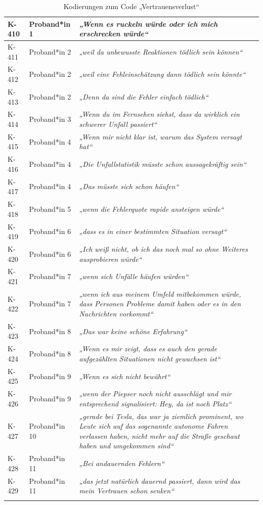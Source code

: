 {\begin{xltabular}{\textwidth}{
    |P{0.10\textwidth}
    |P{0.17\textwidth}
    |Y|
}
K-410 & Proband*in 1 & \textit{„Wenn es ruckeln würde oder ich mich erschrecken würde“} \\
\hline
K-411 & Proband*in 2 & \textit{„weil da unbewusste Reaktionen tödlich sein können“} \\
\hline
K-412 & Proband*in 2 & \textit{„weil eine Fehleinschätzung dann tödlich sein könnte“} \\
\hline
K-413 & Proband*in 2 & \textit{„Denn da sind die Fehler einfach tödlich“} \\
\hline
K-414 & Proband*in 3 & \textit{„Wenn du im Fernsehen siehst, dass da wirklich ein schwerer Unfall passiert“} \\
\hline
K-415 & Proband*in 4 & \textit{„Wenn mir nicht klar ist, warum das System versagt hat“} \\
\hline
K-416 & Proband*in 4 & \textit{„Die Unfallstatistik müsste schon aussagekräftig sein“} \\
\hline
K-417 & Proband*in 4 & \textit{„Das müsste sich schon häufen“} \\
\hline
K-418 & Proband*in 5 & \textit{„wenn die Fehlerquote rapide ansteigen würde“} \\
\hline
K-419 & Proband*in 6 & \textit{„dass es in einer bestimmten Situation versagt“} \\
\hline
K-420 & Proband*in 6 & \textit{„Ich weiß nicht, ob ich das noch mal so ohne Weiteres ausprobieren würde“} \\
\hline
K-421 & Proband*in 7 & \textit{„wenn sich Unfälle häufen würden“} \\
\hline
K-422 & Proband*in 7 & \textit{„wenn ich aus meinem Umfeld mitbekommen würde, dass Personen Probleme damit haben oder es in den Nachrichten vorkommt“} \\
\hline
K-423 & Proband*in 8 & \textit{„Das war keine schöne Erfahrung“} \\
\hline
K-424 & Proband*in 8 & \textit{„Wenn es mir zeigt, dass es auch den gerade aufgezählten Situationen nicht gewachsen ist“} \\
\hline
K-425 & Proband*in 9 & \textit{„Wenn es sich nicht bewährt“} \\
\hline
K-426 & Proband*in 9 & \textit{„wenn der Piepser noch nicht ausschlägt und mir entsprechend signalisiert: Hey, da ist noch Platz“} \\
\hline
K-427 & Proband*in 10 & \textit{„gerade bei Tesla, das war ja ziemlich prominent, wo Leute sich auf das sogenannte autonome Fahren verlassen haben, nicht mehr auf die Straße geschaut haben und umgekommen sind“} \\
\hline
K-428 & Proband*in 11 & \textit{„Bei andauernden Fehlern“} \\
\hline
K-429 & Proband*in 11 & \textit{„das jetzt natürlich dauernd passiert, dann wird das mein Vertrauen schon senken“} \\
\hline
\caption{Kodierungen zum Code „Vertrauensverlust“}\label{tab:kodiernachweis-vertrauensverlust}\\
\end{xltabular}
}

